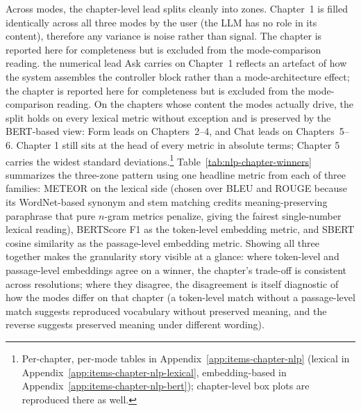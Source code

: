 Across modes, the chapter-level lead splits cleanly into zones.
Chapter~1 is filled identically across all three modes by the
user (the LLM has no role in its content), therefore any variance is noise rather than signal.
The chapter is reported here for completeness but is excluded from the mode-comparison reading.
the numerical lead Ask carries on Chapter~1 reflects an artefact
of how the system assembles the controller block rather than a
mode-architecture effect; the chapter is reported here for
completeness but is excluded from the mode-comparison reading.
On the chapters whose content the modes actually drive, the
split holds on every lexical metric without exception and is
preserved by the BERT-based view: Form leads on Chapters~2--4,
and Chat leads on Chapters~5--6. Chapter 1 still sits at the
head of every metric in absolute terms; Chapter 5 carries the
widest standard deviations.\footnote{Per-chapter, per-mode tables in
Appendix~\ref{app:items-chapter-nlp} (lexical in
Appendix~\ref{app:items-chapter-nlp-lexical}, embedding-based in
Appendix~\ref{app:items-chapter-nlp-bert}); chapter-level box
plots are reproduced there as well.}
Table~\ref{tab:nlp-chapter-winners} summarizes the three-zone
pattern using one headline metric from each of three families:
METEOR on the lexical side (chosen over BLEU and ROUGE because its
WordNet-based synonym and stem matching credits meaning-preserving
paraphrase that pure $n$-gram metrics penalize, giving the fairest
single-number lexical reading), BERTScore F1 as the token-level
embedding metric, and SBERT cosine similarity as the passage-level
embedding metric. Showing all three together makes the
granularity story visible at a glance: where token-level and
passage-level embeddings agree on a winner, the chapter's
trade-off is consistent across resolutions; where they disagree,
the disagreement is itself diagnostic of how the modes differ on
that chapter (a token-level match without a passage-level match
suggests reproduced vocabulary without preserved meaning, and the
reverse suggests preserved meaning under different wording).


